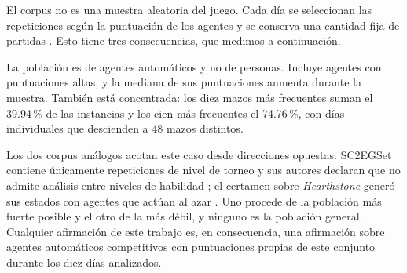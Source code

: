 El corpus no es una muestra aleatoria del juego. Cada día se seleccionan las
repeticiones según la puntuación de los agentes y se conserva una cantidad
fija de partidas \cite{ptcg_dataset_2026}. Esto tiene tres consecuencias,
que medimos a continuación.

La población es de agentes automáticos y no de personas. Incluye agentes con
puntuaciones altas, y la mediana de sus puntuaciones aumenta durante la
muestra. También está concentrada: los diez mazos más frecuentes suman
el 39.94\,\% de las instancias y los cien más frecuentes el 74.76\,\%, con
días individuales que descienden a 48 mazos distintos.

Los dos corpus análogos acotan este caso desde direcciones opuestas. SC2EGSet
contiene únicamente repeticiones de nivel de torneo y sus autores declaran
que no admite análisis entre niveles de habilidad
\cite{bialecki_sc2egset_2023}; el certamen sobre \emph{Hearthstone} generó
sus estados con agentes que actúan al azar
\cite{janusz_hearthstone_2017}. Uno procede de la población más fuerte
posible y el otro de la más débil, y ninguno es la población general.
Cualquier afirmación de este trabajo es, en consecuencia, una afirmación
sobre agentes automáticos competitivos con puntuaciones propias de este
conjunto durante los diez días analizados.
